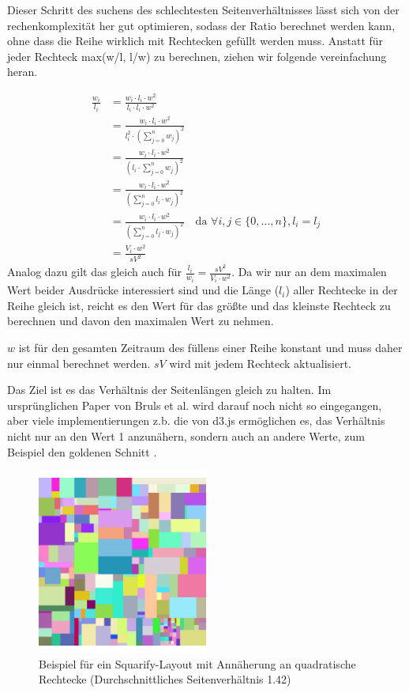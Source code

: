 Dieser Schritt des suchens des schlechtesten Seitenverhältnisses lässt sich von der rechenkomplexität her gut optimieren, sodass der Ratio berechnet werden kann, ohne dass die Reihe wirklich mit Rechtecken gefüllt werden muss. 
Anstatt für jeder Rechteck max(w/l, l/w) zu berechnen, ziehen wir folgende vereinfachung heran.

\begin{align}
    \frac{w_i}{l_i} 
    &= \frac{w_i \cdot l_i \cdot w^2}{l_i \cdot l_i \cdot w^2} \\
    &= \frac{w_i \cdot l_i \cdot w^2}{l_i^2 \cdot \left(\sum_{j=0}^{n} w_j\right)^2} \\
    &= \frac{w_i \cdot l_i \cdot w^2}{\left(l_i \cdot \sum_{j=0}^{n} w_j\right)^2} \\
    &= \frac{w_i \cdot l_i \cdot w^2}{\left(\sum_{j=0}^{n} l_i \cdot w_j\right)^2} \\
    &= \frac{w_i \cdot l_i \cdot w^2}{\left(\sum_{j=0}^{n} l_j \cdot w_j\right)^2}
    \quad\text{da } \forall i, j \in \{0, \dots, n\}, l_i = l_j \\
    &= \frac{V_i \cdot w^2}{sV^2}
\end{align}
Analog dazu gilt das gleich auch für $ \frac{l_i}{w_i} = \frac{sV^2}{V_i \cdot w^2} $. Da wir nur an dem maximalen Wert beider Ausdrücke interessiert sind und die Länge ($l_i$) aller Rechtecke in der Reihe gleich ist, reicht es den Wert für das größte und das kleinste Rechteck zu berechnen und davon den maximalen Wert zu nehmen.

$w$ ist für den gesamten Zeitraum des füllens einer Reihe konstant und muss daher nur einmal berechnet werden. $sV$ wird mit jedem Rechteck aktualisiert. 

Das Ziel ist es das Verhältnis der Seitenlängen gleich zu halten. Im ursprünglichen Paper von Bruls et al. \cite{bruls2000squarified} wird darauf noch nicht so eingegangen, aber viele implementierungen z.b. die von d3.js \cite{d3_treemap_code} ermöglichen es, das Verhältnis nicht nur an den Wert 1 anzunähern, sondern auch an andere Werte, zum Beispiel den goldenen Schnitt \cite{goldenRatio}. 

\begin{figure}[h]
    \centering
    \includegraphics[width=0.5\textwidth]{images/oneSquarify.png}
    \caption{Beispiel für ein Squarify-Layout mit Annäherung an quadratische Rechtecke (Durchschnittliches Seitenverhältnis 1.42)}
    \label{fig:squarifyRatio1}
\end{figure}

